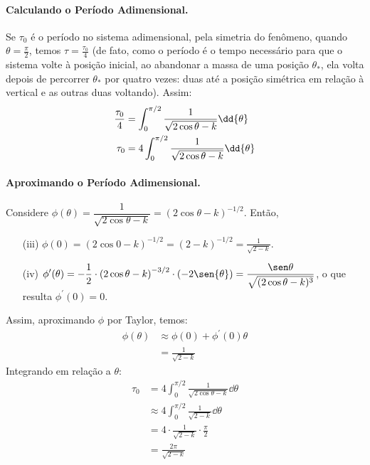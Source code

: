 \begin{solution}
\paragraph{Calculando o Período Adimensional.}
Se $\tau_0$ é o período no sistema adimensional, pela simetria do fenômeno,
quando $\theta = \frac{\pi}{2}$, temos $\tau = \frac{\tau_0}{4}$ (de fato, como
o período é o tempo necessário para que o sistema volte à posição inicial, ao
abandonar a massa de uma posição $\theta_\ast$, ela volta depois de percorrer
$\theta_\ast$ por quatro vezes: duas até a posição simétrica em relação à 
vertical e as outras duas voltando).
Assim:
\begin{align}
 \frac{\tau_0}{4} &= \int_{0}^{\pi/2}\frac{1}{\sqrt{2\cos\theta - k}}\dd{\theta}\notag\\
	\tau_0 &= 4 \int_{0}^{\pi/2}\frac{1}{\sqrt{2\cos\theta - k}}\dd{\theta}
\end{align}

\paragraph{Aproximando o Período Adimensional.}
Considere $\phi(\theta) = \dfrac{1}{\sqrt{2\cos\theta - k}} = \left(2\cos\theta - k\right)^{-1/2} $.
Então,
\begin{enumerate}
 \item[(iii)] $\displaystyle \phi (0) = (2\cos 0 - k)^{-1/2} = (2 - k)^{-1/2} = \frac{1}{\sqrt{2 - k}}$.
	\item[(iv)] $\displaystyle \phi^{\prime} (\theta) = -\dfrac{1}{2}\cdot \left(2\cos\theta - k\right)^{-3/2}\cdot \left(-2\sen{\theta}\right) = \dfrac{\sen\theta}{\sqrt{(2\cos\theta - k)^{3}}}$, o que 
	 resulta $\phi^{\prime}(0) = 0$.
\end{enumerate}
Assim, aproximando $\phi$ por Taylor, temos:
\begin{align*}
 \phi (\theta) &\approx \phi{(0)} + \phi^{\prime}(0)\theta\\
	&= \frac{1}{\sqrt{2 - k}} 
\end{align*}
Integrando em relação a $\theta$:
\begin{align*}
 \tau_0 &= 4 \int_{0}^{\pi/2}\frac{1}{\sqrt{2\cos\theta - k}}\dd{\theta}\\
	&\approx 4 \int_{0}^{\pi/2} \frac{1}{\sqrt{2 - k}}  \dd{\theta}\\
	&= 4\cdot \frac{1}{\sqrt{2 - k}} \cdot \frac{\pi}{2}\\
	&= \frac{2\pi}{\sqrt{2 - k}}
\end{align*}


\end{solution}
